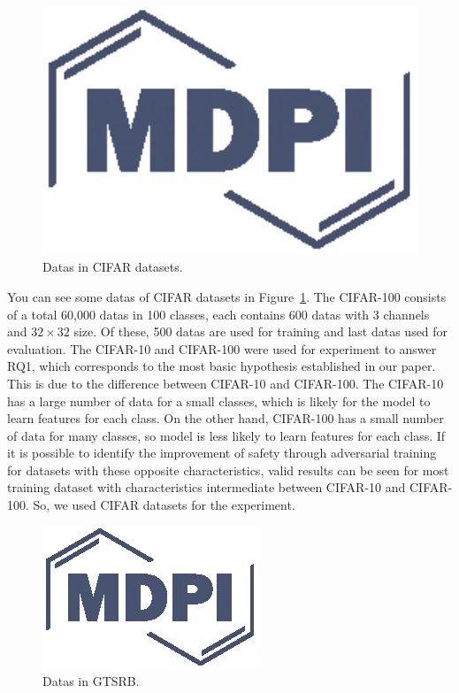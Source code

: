 \documentclass[journal,article,submit,moreauthors,pdftex]{Definitions/mdpi}
\begin{document}
\begin{figure}[H] 
\includegraphics[width=13cm]{Definitions/logo-mdpi}
\caption{Datas in CIFAR datasets.\label{cifar-datasets}}
\end{figure} 

You can see some datas of CIFAR datasets in Figure~\ref{cifar-datasets}.
The CIFAR-100 consists of a total 60,000 datas in 100 classes, each contains 600 datas with 3 channels and \begin{math}{32\times 32}\end{math} size. Of these, 500 datas are used for training and last datas used for evaluation.
The CIFAR-10 and CIFAR-100 were used for experiment to answer RQ1, which corresponds to the most basic hypothesis established in our paper.
This is due to the difference between CIFAR-10 and CIFAR-100. The CIFAR-10 has a large number of data for a small classes, which is likely for the model to learn features for each class.
On the other hand, CIFAR-100 has a small number of data for many classes, so model is less likely to learn features for each class.
If it is possible to identify the improvement of safety through adversarial training for datasets with these opposite characteristics, valid results can be seen for most training dataset with characteristics intermediate between CIFAR-10 and CIFAR-100. So, we used CIFAR datasets for the experiment.

\begin{figure}[H] 
\includegraphics[width=13 cm]{Definitions/logo-mdpi}
\caption{Datas in GTSRB.\label{gtsrb-datasets}}
\end{figure} 
\end{document}
